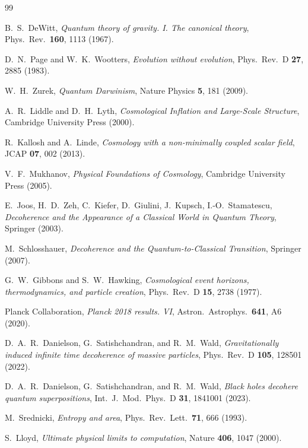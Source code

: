 \documentclass[11pt,a4paper]{article}
\begin{document}
\begin{thebibliography}{99}

B.~S.~DeWitt,
\emph{Quantum theory of gravity. I. The canonical theory},
Phys.\ Rev.\ \textbf{160}, 1113 (1967).

D.~N.~Page and W.~K.~Wootters,
\emph{Evolution without evolution},
Phys.\ Rev.\ D \textbf{27}, 2885 (1983).

W.~H.~Zurek, \emph{Quantum Darwinism},
Nature Physics \textbf{5}, 181 (2009).

A.~R.~Liddle and D.~H.~Lyth,
\emph{Cosmological Inflation and Large-Scale Structure},
Cambridge University Press (2000).

R.~Kallosh and A.~Linde,
\emph{Cosmology with a non-minimally coupled scalar field},
JCAP \textbf{07}, 002 (2013).

V.~F.~Mukhanov, \emph{Physical Foundations of Cosmology},
Cambridge University Press (2005).

E.~Joos, H.~D.~Zeh, C.~Kiefer, D.~Giulini, J.~Kupsch,
I.-O.~Stamatescu,
\emph{Decoherence and the Appearance of a Classical World in
Quantum Theory}, Springer (2003).

M.~Schlosshauer,
\emph{Decoherence and the Quantum-to-Classical Transition},
Springer (2007).

G.~W.~Gibbons and S.~W.~Hawking,
\emph{Cosmological event horizons, thermodynamics, and particle
creation}, Phys.\ Rev.\ D \textbf{15}, 2738 (1977).

Planck Collaboration, \emph{Planck 2018 results. VI},
Astron.\ Astrophys.\ \textbf{641}, A6 (2020).

D.~A.~R.~Danielson, G.~Satishchandran, and R.~M.~Wald,
\emph{Gravitationally induced infinite time decoherence of massive
particles}, Phys.\ Rev.\ D \textbf{105}, 128501 (2022).

D.~A.~R.~Danielson, G.~Satishchandran, and R.~M.~Wald,
\emph{Black holes decohere quantum superpositions},
Int.\ J.\ Mod.\ Phys.\ D \textbf{31}, 1841001 (2023).

M.~Srednicki, \emph{Entropy and area},
Phys.\ Rev.\ Lett.\ \textbf{71}, 666 (1993).

S.~Lloyd, \emph{Ultimate physical limits to computation},
Nature \textbf{406}, 1047 (2000).


\end{thebibliography}
\end{document}
